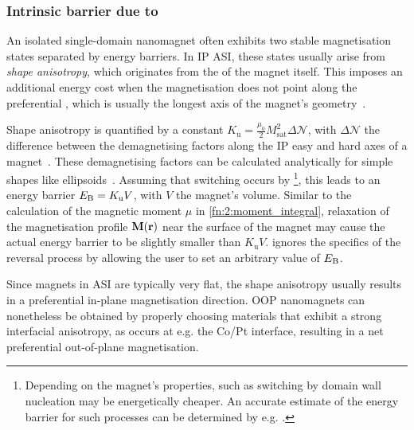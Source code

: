 \subsubsection{Intrinsic barrier due to } %
\label{sec:2:shape_anisotropy}
An isolated single-domain nanomagnet often exhibits two stable magnetisation states separated by energy barriers.
In IP ASI, these states usually arise from \textit{shape anisotropy}, which originates from the  of the magnet itself.
This imposes an additional energy cost when the magnetisation does not point along the preferential , which is usually the longest axis of the magnet's geometry~\cite{PhD_Leliaert}. \par
Shape anisotropy is quantified by a  constant $K_\mathrm{u} = \frac{\mu_0}{2} M_\mathrm{sat}^2 \Delta \mathcal{N}$, with $\Delta \mathcal{N}$ the difference between the demagnetising factors along the IP easy and hard axes of a magnet~\cite{AdvancesASI,VogelFulcherTammannFreezing,andersson2016thermally}. %
These demagnetising factors can be calculated analytically for simple shapes like ellipsoids~\cite{EllipsoidDemag,EllipseDemag}.
Assuming that switching occurs by \footnote{
	Depending on the magnet's properties,  such as switching by domain wall nucleation may be energetically cheaper.
	An accurate estimate of the energy barrier for such processes can be determined by e.g. .
}, this leads to an energy barrier $E_\mathrm{B} = K_\mathrm{u} V$, with $V$ the magnet's volume.
Similar to the calculation of the magnetic moment $\mu$ in \cref{fn:2:moment_integral}, relaxation of the magnetisation profile $\boldsymbol{\mathbf{M}}(\boldsymbol{\mathbf{r}})$ near the surface of the magnet may cause the actual energy barrier to be slightly smaller than $K_\mathrm{u} V$.
\hotspice ignores the specifics of the reversal process by allowing the user to set an arbitrary value of $E_\mathrm{B}$. \par
Since magnets in ASI are typically very flat, the shape anisotropy usually results in a preferential in-plane magnetisation direction.
OOP nanomagnets can nonetheless be obtained by properly choosing materials that exhibit a strong interfacial anisotropy, as occurs at e.g. the Co/Pt interface, resulting in a net preferential out-of-plane magnetisation.


